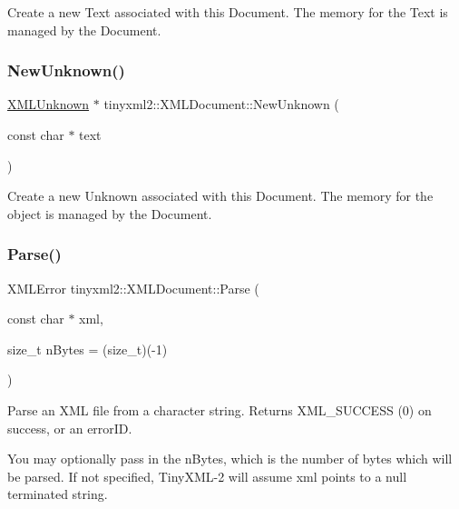 Create a new Text associated with this Document. The memory for the Text is managed by the Document. \mbox{\label{classtinyxml2_1_1_x_m_l_document_a4954f502c5fd7f49de54c3c0c99bb73d}} 
\subsubsection{\texorpdfstring{NewUnknown()}{NewUnknown()}}
{\footnotesize\ttfamily \mbox{\hyperlink{classtinyxml2_1_1_x_m_l_unknown}{X\+M\+L\+Unknown}} $\ast$ tinyxml2\+::\+X\+M\+L\+Document\+::\+New\+Unknown (\begin{DoxyParamCaption}\item[{const char $\ast$}]{text }\end{DoxyParamCaption})}

Create a new Unknown associated with this Document. The memory for the object is managed by the Document. \mbox{\label{classtinyxml2_1_1_x_m_l_document_a1819bd34f540a7304c105a6232d25a1f}} 
\subsubsection{\texorpdfstring{Parse()}{Parse()}}
{\footnotesize\ttfamily X\+M\+L\+Error tinyxml2\+::\+X\+M\+L\+Document\+::\+Parse (\begin{DoxyParamCaption}\item[{const char $\ast$}]{xml,  }\item[{size\+\_\+t}]{n\+Bytes = {\ttfamily (size\+\_\+t)(-\/1)} }\end{DoxyParamCaption})}

Parse an X\+ML file from a character string. Returns X\+M\+L\+\_\+\+S\+U\+C\+C\+E\+SS (0) on success, or an error\+ID.

You may optionally pass in the \textquotesingle{}n\+Bytes\textquotesingle{}, which is the number of bytes which will be parsed. If not specified, Tiny\+X\+M\+L-\/2 will assume \textquotesingle{}xml\textquotesingle{} points to a null terminated string. \mbox{\label{classtinyxml2_1_1_x_m_l_document_a867cf5fa3e3ff6ae4847a8b7ee8ec083}} 
